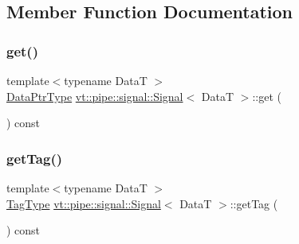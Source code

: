 \subsection{Member Function Documentation}
\mbox{\label{structvt_1_1pipe_1_1signal_1_1_signal_a0d6606179504be4e4c02d0ea80aec823}} 
\subsubsection{\texorpdfstring{get()}{get()}}
{\footnotesize\ttfamily template$<$typename DataT $>$ \\
\hyperlink{structvt_1_1pipe_1_1signal_1_1_signal_a9c8166338314e5d595575c21eaa42859}{Data\+Ptr\+Type} \hyperlink{structvt_1_1pipe_1_1signal_1_1_signal}{vt\+::pipe\+::signal\+::\+Signal}$<$ DataT $>$\+::get (\begin{DoxyParamCaption}{ }\end{DoxyParamCaption}) const\hspace{0.3cm}{\ttfamily [inline]}}

\mbox{\label{structvt_1_1pipe_1_1signal_1_1_signal_a0d55d4712aadfc8cc848e8bd45814351}} 
\subsubsection{\texorpdfstring{get\+Tag()}{getTag()}}
{\footnotesize\ttfamily template$<$typename DataT $>$ \\
\hyperlink{namespacevt_a84ab281dae04a52a4b243d6bf62d0e52}{Tag\+Type} \hyperlink{structvt_1_1pipe_1_1signal_1_1_signal}{vt\+::pipe\+::signal\+::\+Signal}$<$ DataT $>$\+::get\+Tag (\begin{DoxyParamCaption}{ }\end{DoxyParamCaption}) const\hspace{0.3cm}{\ttfamily [inline]}}

\mbox{\label{structvt_1_1pipe_1_1signal_1_1_signal_a31c544fb4732587116decd8adddc6fa3}} 
